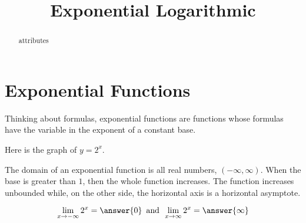 \documentclass{ximera}
\title{Exponential Logarithmic}
\begin{document}
\begin{abstract}
attributes
\end{abstract}
\maketitle


\section{Exponential Functions}

Thinking about formulas, exponential functions are functions whose formulas have the variable in the exponent of a constant base.




\begin{example}

Here is the graph of $y = 2^x$.

\begin{image}
\end{image}


The domain of an exponential function is all real numbers, $(-\infty, \infty)$.  When the base is greater than $1$, then the whole function increases.  The function increases unbounded while, on the other side, the horizontal axis is a horizontal asymptote.

\[  \lim_{x \to -\infty} 2^x = \answer{0}     \, \text{ and } \,  \lim_{x \to \infty} 2^x = \answer{\infty}   \]

\end{example}
\end{document}
